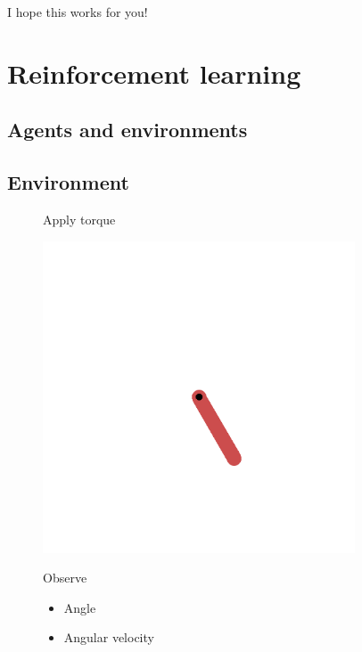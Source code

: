 \documentclass[
  letterpaper,
  DIV=11,
  numbers=noendperiod,
  oneside]{scrartcl}
\providecommand{\tightlist}{%
  \setlength{\itemsep}{0pt}\setlength{\parskip}{0pt}}\usepackage{longtable,booktabs,array}
\begin{document}
I hope this works for you!

\section{Reinforcement learning}\label{reinforcement-learning}

\subsection{Agents and environments}\label{agents-and-environments}

\subsection{Environment}\label{environment}

\begin{figure}

\begin{minipage}{0.23\linewidth}
Apply torque\end{minipage}%
%
\begin{minipage}{0.39\linewidth}
\begin{center}
\includegraphics[width=\textwidth,height=3.64583in]{figs/pendulum.gif}
\end{center}
\end{minipage}%
%
\begin{minipage}{0.39\linewidth}
Observe

\begin{itemize}
\tightlist
\item
  Angle
\item
  Angular velocity
\end{itemize}

\end{minipage}%

\end{figure}%
\end{document}
